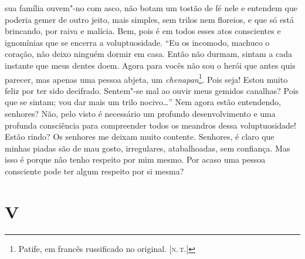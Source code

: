 sua família ouvem"-no com asco, não botam um tostão de fé nele e entendem
que poderia gemer de outro jeito, mais simples, sem trilos nem floreios,
e que só está brincando, por raiva e malícia. Bem, pois é em todos esses
atos conscientes e ignomínias que se encerra a voluptuosidade. ``Eu os
incomodo, machuco o coração, não deixo ninguém dormir em casa. Então não
durmam, sintam a cada instante que meus dentes doem. Agora para vocês
não sou o herói que antes quis parecer, mas apenas uma pessoa abjeta, um
\emph{chenapan}\footnote{Patife, em francês russificado no original. {[}\textsc{n.\,t.}{]}}. Pois seja! Estou muito feliz por ter sido decifrado.
Sentem"-se mal ao ouvir meus gemidos canalhas? Pois que se sintam; vou
dar mais um trilo nocivo\ldots{}'' Nem agora estão entendendo, senhores? Não,
pelo visto é necessário um profundo desenvolvimento e uma profunda
consciência para compreender todos os meandros dessa voluptuosidade!
Estão rindo? Os senhores me deixam muito contente. Senhores, é claro que
minhas piadas são de mau gosto, irregulares, atabalhoadas, sem
confiança. Mas isso é porque não tenho respeito por mim mesmo. Por acaso
uma pessoa consciente pode ter algum respeito por si mesma?

\section{V}

